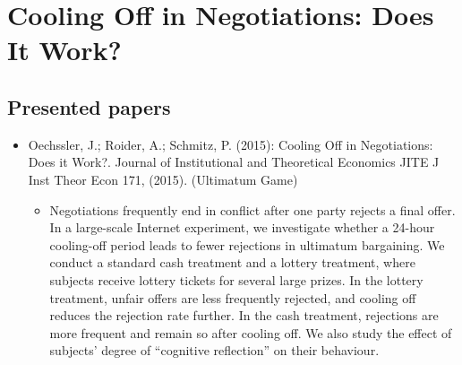 

\chapter{Cooling Off in Negotiations: Does It Work?}

\section{Presented papers}

\begin{itemize}
	\item Oechssler, J.; Roider, A.; Schmitz, P. (2015): Cooling Off in Negotiations: Does it Work?. Journal of Institutional and Theoretical Economics JITE J Inst Theor Econ 171, (2015). (Ultimatum Game)
		\begin{itemize}
			\item Negotiations frequently end in conflict after one party rejects a final offer. In a large-scale Internet experiment, we investigate whether a 24-hour cooling-off period leads to fewer rejections in ultimatum bargaining. We conduct a standard cash treatment and a lottery treatment, where subjects receive lottery tickets for several large prizes. In the lottery treatment, unfair offers are less frequently rejected, and cooling off reduces the rejection rate further. In the cash treatment, rejections are more frequent and remain so after cooling off. We also study the effect of subjects’ degree of “cognitive reflection” on their behaviour.
		\end{itemize}
\end{itemize}



\newpage